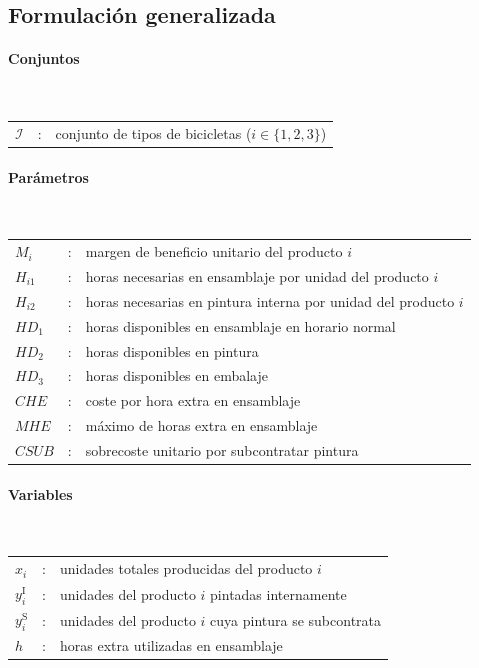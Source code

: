 \subsection{Formulación generalizada}

\paragraph{Conjuntos}\mbox{}\\
\begin{tabular}{lcl}
$\mathcal{I}$ & : & conjunto de tipos de bicicletas ($i \in \{1,2,3\}$) \\
\end{tabular}

\paragraph{Parámetros}\mbox{}\\
\begin{tabular}{lcl}
$M_i$     & : & margen de beneficio unitario del producto $i$ \\
$H_{i1}$  & : & horas necesarias en ensamblaje por unidad del producto $i$ \\
$H_{i2}$  & : & horas necesarias en pintura interna por unidad del producto $i$ \\
$HD_1$    & : & horas disponibles en ensamblaje en horario normal \\
$HD_2$    & : & horas disponibles en pintura \\
$HD_3$    & : & horas disponibles en embalaje \\
$CHE$     & : & coste por hora extra en ensamblaje \\
$MHE$     & : & máximo de horas extra en ensamblaje \\
$CSUB$    & : & sobrecoste unitario por subcontratar pintura \\
\end{tabular}

\paragraph{Variables}\mbox{}\\
\begin{tabular}{lcl}
$x_i$ & : & unidades totales producidas del producto $i$ \\
$y_i^{\mathrm{I}}$ & : & unidades del producto $i$ pintadas internamente \\
$y_i^{\mathrm{S}}$ & : & unidades del producto $i$ cuya pintura se subcontrata \\
$h$ & : & horas extra utilizadas en ensamblaje \\
\end{tabular}

